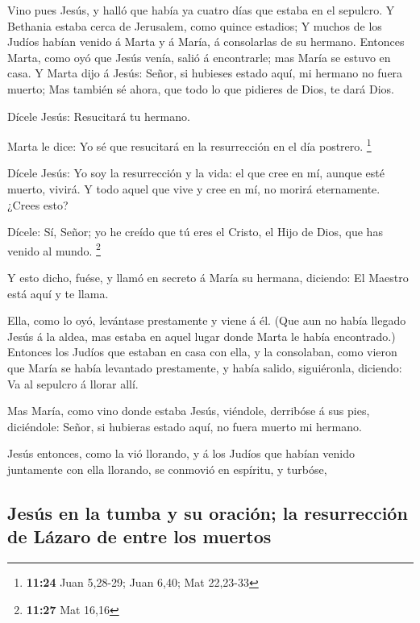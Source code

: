  Vino pues Jesús, y halló que había ya cuatro días que
estaba en el sepulcro.  Y Bethania estaba cerca de
Jerusalem, como quince estadios;  Y muchos de los Judíos
habían venido á Marta y á María, á consolarlas de su hermano.
 Entonces Marta, como oyó que Jesús venía, salió á
encontrarle; mas María se estuvo en casa.  Y Marta dijo á
Jesús: Señor, si hubieses estado aquí, mi hermano no fuera muerto;
 Mas también sé ahora, que todo lo que pidieres de Dios, te
dará Dios.

 Dícele Jesús: Resucitará tu hermano.

 Marta le dice: Yo sé que resucitará en la resurrección en
el día postrero. \footnote{\textbf{11:24} Juan 5,28-29; Juan 6,40; Mat
  22,23-33}

 Dícele Jesús: Yo soy la resurrección y la vida: el que
cree en mí, aunque esté muerto, vivirá.  Y todo aquel que
vive y cree en mí, no morirá eternamente. ¿Crees esto?

 Dícele: Sí, Señor; yo he creído que tú eres el Cristo, el
Hijo de Dios, que has venido al mundo. \footnote{\textbf{11:27} Mat
  16,16}

 Y esto dicho, fuése, y llamó en secreto á María su
hermana, diciendo: El Maestro está aquí y te llama.

 Ella, como lo oyó, levántase prestamente y viene á él.
 (Que aun no había llegado Jesús á la aldea, mas estaba en
aquel lugar donde Marta le había encontrado.)  Entonces los
Judíos que estaban en casa con ella, y la consolaban, como vieron que
María se había levantado prestamente, y había salido, siguiéronla,
diciendo: Va al sepulcro á llorar allí.

 Mas María, como vino donde estaba Jesús, viéndole,
derribóse á sus pies, diciéndole: Señor, si hubieras estado aquí, no
fuera muerto mi hermano.

 Jesús entonces, como la vió llorando, y á los Judíos que
habían venido juntamente con ella llorando, se conmovió en espíritu, y
turbóse,

\hypertarget{jesuxfas-en-la-tumba-y-su-oraciuxf3n-la-resurrecciuxf3n-de-luxe1zaro-de-entre-los-muertos}{%
\subsection{Jesús en la tumba y su oración; la resurrección de Lázaro de
entre los
muertos}\label{jesuxfas-en-la-tumba-y-su-oraciuxf3n-la-resurrecciuxf3n-de-luxe1zaro-de-entre-los-muertos}}

